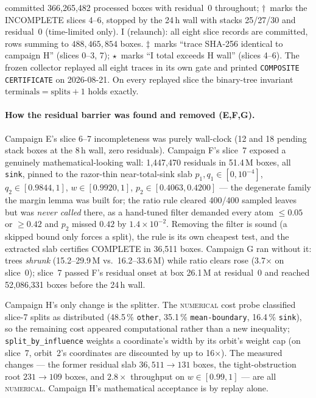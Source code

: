 \documentclass[11pt]{article}
\theoremstyle{plain}
\theoremstyle{definition}
\theoremstyle{remark}
\newcommand{\NUMERICAL}{\textsc{numerical}}
\begin{document}
\begin{table}[htbp]
{committed 366{,}265{,}482 processed boxes with residual~0 throughout;
$\dagger$~marks the INCOMPLETE slices 4--6, stopped by the 24\,h wall with
stacks 25/27/30 and residual~0 (time-limited only). I (relaunch): all eight
slice records are committed, rows summing to $488{,}465{,}854$ boxes.
$\ddagger$~marks ``trace SHA-256 identical to campaign H'' (slices 0--3, 7);
$\star$~marks ``I total exceeds H wall'' (slices 4--6). The frozen collector
replayed all eight traces in its own gate and printed \texttt{COMPOSITE
CERTIFICATE} on 2026-08-21. On every replayed slice the binary-tree invariant
$\text{terminals}=\text{splits}+1$ holds exactly.}
\label{tab:campaigns}
\end{table}

\paragraph{How the residual barrier was found and removed (E,F,G).}
Campaign E's slice 6--7 incompleteness was purely wall-clock (12 and 18 pending
stack boxes at the 8\,h wall, zero residuals). Campaign F's slice~7 exposed a
genuinely mathematical-looking wall: 1{,}447{,}470 residuals in 51.4\,M
boxes, all \texttt{sink}, pinned to the razor-thin near-total-sink slab
$p_1,q_1\in[0,10^{-4}]$, $q_2\in[0.9844,1]$, $w\in[0.9920,1]$,
$p_2\in[0.4063,0.4200]$ --- the degenerate family the margin lemma was built
for; the ratio rule cleared 400/400 sampled leaves but was \emph{never called}
there, as a hand-tuned filter demanded every atom $\le0.05$ or $\ge0.42$ and
$p_2$ missed $0.42$ by $1.4\times10^{-2}$. Removing the filter is sound (a
skipped bound only forces a split), the rule is its own cheapest test, and the
extracted slab certifies COMPLETE in 36{,}511 boxes. Campaign G ran without it:
trees \emph{shrunk} (15.2--29.9\,M vs.\ 16.2--33.6\,M) while ratio clears
rose (3.7$\times$ on slice~0); slice~7 passed F's residual onset at box
26.1\,M at residual~0 and reached 52{,}086{,}331 boxes before the 24\,h wall.

Campaign H's only change is the splitter.  The \NUMERICAL{} cost probe
classified slice-7 splits as distributed (48.5\,\% \texttt{other},
35.1\,\% \texttt{mean-boundary}, 16.4\,\% \texttt{sink}), so the remaining
cost appeared computational rather than a new inequality;
\texttt{split\_by\_influence} weights a coordinate's width by its orbit's
weight cap (on slice~7, orbit~2's coordinates are discounted by up to
16$\times$).  The measured changes --- the former residual slab
$36{,}511\to131$ boxes, the tight-obstruction root $231\to109$ boxes, and
$2.8\times$ throughput on $w\in[0.99,1]$ --- are all \NUMERICAL{}.
Campaign H's mathematical acceptance is by replay alone.
\end{document}
